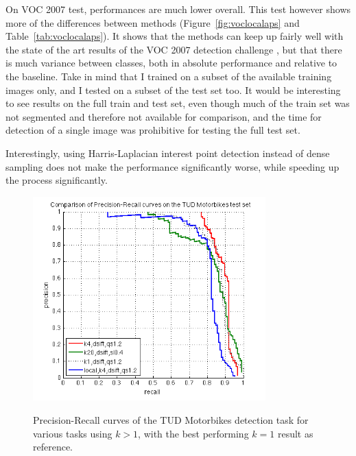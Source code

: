 On VOC 2007 test, performances are much lower overall. This test however shows more of the differences between methods (Figure~\ref{fig:voclocalaps} and Table~\ref{tab:voclocalaps}). It shows that the methods can keep up fairly well with the state of the art results of the VOC 2007 detection challenge \cite{pascal-voc-2007}, but that there is much variance between classes, both in absolute performance and relative to the baseline. Take in mind that I trained on a subset of the available training images only, and I tested on a subset of the test set too. It would be interesting to see results on the full train and test set, even though much of the train set was not segmented and therefore not available for comparison, and the time for detection of a single image was prohibitive for testing the full test set.

Interestingly, using Harris-Laplacian interest point detection instead of dense sampling does not make the performance significantly worse, while speeding up the process significantly.

\begin{figure}[hbt]
    \centering
    \includegraphics[width=0.8\textwidth]{TUD_local}
    \label{fig:tudlocalprecrec}
    \caption{Precision-Recall curves of the TUD Motorbikes detection task for various tasks using $k>1$, with the best performing $k=1$ result as reference.}
\end{figure}

